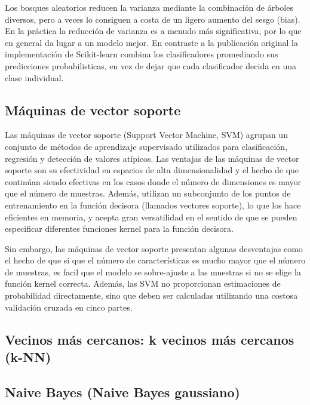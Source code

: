 Los bosques aleatorios reducen la varianza mediante la combinación de árboles diversos, pero a veces lo consiguen a costa de un ligero aumento del sesgo (bias).
En la práctica la reducción de varianza es a menudo más significativa, por lo que en general da lugar a un modelo mejor.
En contraste a la publicación original %
la implementación de Scikit-learn combina los clasificadores promediando sus predicciones probabilisticas, en vez de dejar que cada clasificador decida en una clase individual.

\subsection{Máquinas de vector soporte}


Las máquinas de vector soporte (Support Vector Machine, SVM) agrupan un conjunto de métodos de aprendizaje supervisado utilizados para clasificación, regresión y detección de valores atípicos. Las ventajas de las máquinas de vector soporte son su efectividad en espacios de alta dimensionalidad y el hecho de que continúan siendo efectivas en los casos donde el número de dimensiones es mayor que el número de muestras.
Además, utilizan un subconjunto de los puntos de entrenamiento en la función decisora (llamados vectores soporte), lo que los hace eficientes en memoria, y acepta gran versatilidad en el sentido de que se pueden especificar diferentes funciones kernel para la función decisora.

Sin embargo, las máquinas de vector soporte presentan algunas desventajas como el hecho de que si que el número de características es mucho mayor que el número de muestras, es facil que el modelo se sobre-ajuste a las muestras si no se elige la función kernel correcta. 
Además, las SVM no proporcionan estimaciones de probabilidad directamente, sino que deben ser calculadas utilizando una costosa validación cruzada en cinco partes.

\subsection{Vecinos más cercanos: k vecinos más cercanos (k-NN)}
\subsection{Naive Bayes (Naive Bayes gaussiano)}


